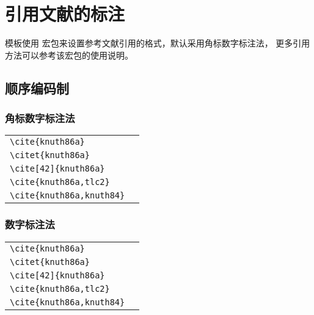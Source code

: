 
\chapter{引用文献的标注}

模板使用  宏包来设置参考文献引用的格式，默认采用角标数字标注法，
更多引用方法可以参考该宏包的使用说明。

\section{顺序编码制}

\subsection{角标数字标注法}

\noindent
\begin{tabular}{l@{\quad$\Rightarrow$\quad}l}
  \verb|\cite{knuth86a}|         & \cite{knuth86a}         \\
  \verb|\citet{knuth86a}|        & \citet{knuth86a}        \\
  \verb|\cite[42]{knuth86a}|     & \cite[42]{knuth86a}     \\
  \verb|\cite{knuth86a,tlc2}|    & \cite{knuth86a,tlc2}    \\
  \verb|\cite{knuth86a,knuth84}| & \cite{knuth86a,knuth84} \\
\end{tabular}


\subsection{数字标注法}

\noindent
\begin{tabular}{l@{\quad$\Rightarrow$\quad}l}
  \verb|\cite{knuth86a}|         & \cite{knuth86a}         \\
  \verb|\citet{knuth86a}|        & \citet{knuth86a}        \\
  \verb|\cite[42]{knuth86a}|     & \cite[42]{knuth86a}     \\
  \verb|\cite{knuth86a,tlc2}|    & \cite{knuth86a,tlc2}    \\
  \verb|\cite{knuth86a,knuth84}| & \cite{knuth86a,knuth84} \\
\end{tabular}



